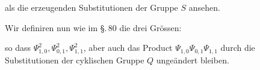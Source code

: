 als die erzeugenden Substitutionen der Gruppe $S$ ansehen.

Wir definiren nun wie im \S.\,80 die drei Grössen:

so dass $\Psi^2_{1,0}, \Psi^2_{0,1}, \Psi^2_{1,1}$, aber auch das Product
$\Psi_{1,0}\Psi_{0,1}\Psi_{1,1}$ durch die Substitutionen der cyklischen
Gruppe $Q$ ungeändert bleiben.
